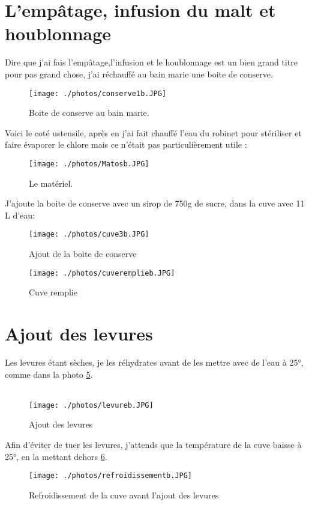 \documentclass[twoside,twocolumn]{report}
\begin{document}
		\section{L'empâtage, infusion du malt et houblonnage} 
			Dire que j'ai fais l'empâtage,l'infusion et le houblonnage est un bien grand titre pour pas grand chose, j'ai réchauffé au bain marie une boite de conserve. \\
			 \begin{figure}[h!]
			 	\centering
			 	\texttt{[image: ./photos/conserve1b.JPG]}
			 	\caption{Boite de conserve au bain marie.}
			 	\label{boite}
			 \end{figure}
			Voici le coté ustensile, après en j'ai fait chauffé l'eau du robinet pour stériliser et faire évaporer le chlore mais ce n'était pas particulièrement utile :
			\begin{figure}[h!]
				\centering
				\texttt{[image: ./photos/Matosb.JPG]}
				\caption{Le matériel.}
				\label{matos}
			\end{figure}
			J'ajoute la boite de conserve avec un sirop de 750g de sucre, dans la cuve avec 11 L d'eau:
			\begin{figure}[h!]
				\centering
				\texttt{[image: ./photos/cuve3b.JPG]}
				\caption{Ajout de la boite de conserve}
				\label{cuve}
			\end{figure}
			\begin{figure}[h!]
			\centering
			\texttt{[image: ./photos/cuveremplieb.JPG]}
			\caption{Cuve remplie}
			\label{cuver}
			\end{figure}
			\section{Ajout des levures}
			Les levures étant sèches, je les réhydrates avant de les mettre avec de l'eau à 25°, comme dans la photo \ref{levure}.\\ \\
			\begin{figure}[h!]
				\centering
				\texttt{[image: ./photos/levureb.JPG]}
				\caption{Ajout des levures}
				\label{levure}
			\end{figure}
			Afin d'éviter de tuer les levures, j'attends que la température de la cuve baisse à 25°, en la mettant dehors \ref{refroid}.
			\begin{figure}[h!]
				\centering
				\texttt{[image: ./photos/refroidissementb.JPG]}
				\caption{Refroidissement de la cuve avant l'ajout des levures}
				\label{refroid}
			\end{figure}
		
\end{document}
